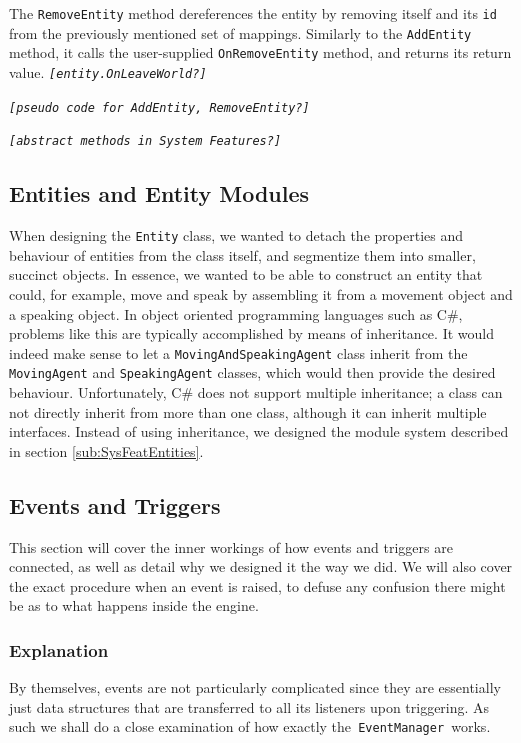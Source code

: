 The \texttt{RemoveEntity} method dereferences the entity by removing
itself and its \texttt{id} from the previously mentioned set of mappings.
Similarly to the \texttt{AddEntity} method, it calls the user-supplied
\texttt{OnRemoveEntity} method, and returns its return value. \texttt{\emph{{[}entity.OnLeaveWorld?{]}}}

\texttt{\emph{{[}pseudo code for AddEntity, RemoveEntity?{]}}}

\texttt{\emph{{[}abstract methods in System Features?{]}}}


\subsection{Entities and Entity Modules}

When designing the \texttt{Entity} class, we wanted to detach the
properties and behaviour of entities from the class itself, and segmentize
them into smaller, succinct objects. In essence, we wanted to be able
to construct an entity that could, for example, move and speak by
assembling it from a movement object and a speaking object. In object
oriented programming languages such as C\#, problems like this are
typically accomplished by means of inheritance. It would indeed make
sense to let a \texttt{MovingAndSpeakingAgent} class inherit from
the \texttt{MovingAgent} and \texttt{SpeakingAgent} classes, which
would then provide the desired behaviour. Unfortunately, C\# does
not support multiple inheritance; a class can not directly inherit
from more than one class, although it can inherit multiple interfaces.
Instead of using inheritance, we designed the module system described
in section \ref{sub:SysFeatEntities}.


\subsection{Events and Triggers}

This section will cover the inner workings of how events and triggers
are connected, as well as detail why we designed it the way we did.
We will also cover the exact procedure when an event is raised, to
defuse any confusion there might be as to what happens inside the
engine.


\subsubsection*{Explanation}

By themselves, events are not particularly complicated since they
are essentially just data structures that are transferred to all its
listeners upon triggering. As such we shall do a close examination
of how exactly the\texttt{ EventManager }works.

